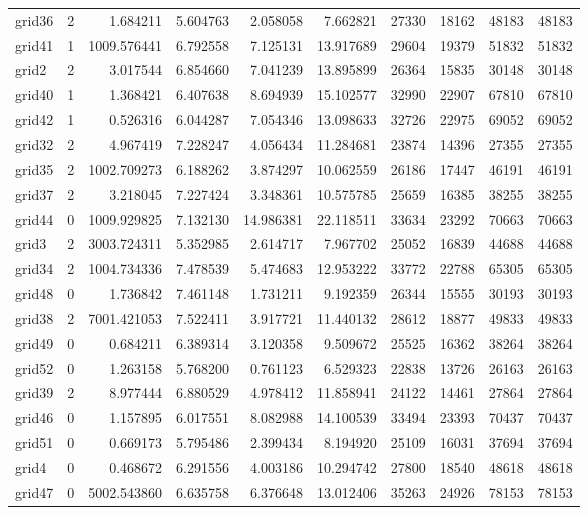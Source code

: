 \begin{longtable}{|l|r|r|r|r|r|r|r|r|r|}
grid36 & 2 & 1.684211 & 5.604763 & 2.058058 & 7.662821 & 27330 & 18162 & 48183 & 48183 \\
grid41 & 1 & 1009.576441 & 6.792558 & 7.125131 & 13.917689 & 29604 & 19379 & 51832 & 51832 \\
grid2 & 2 & 3.017544 & 6.854660 & 7.041239 & 13.895899 & 26364 & 15835 & 30148 & 30148 \\
grid40 & 1 & 1.368421 & 6.407638 & 8.694939 & 15.102577 & 32990 & 22907 & 67810 & 67810 \\
grid42 & 1 & 0.526316 & 6.044287 & 7.054346 & 13.098633 & 32726 & 22975 & 69052 & 69052 \\
grid32 & 2 & 4.967419 & 7.228247 & 4.056434 & 11.284681 & 23874 & 14396 & 27355 & 27355 \\
grid35 & 2 & 1002.709273 & 6.188262 & 3.874297 & 10.062559 & 26186 & 17447 & 46191 & 46191 \\
grid37 & 2 & 3.218045 & 7.227424 & 3.348361 & 10.575785 & 25659 & 16385 & 38255 & 38255 \\
grid44 & 0 & 1009.929825 & 7.132130 & 14.986381 & 22.118511 & 33634 & 23292 & 70663 & 70663 \\
grid3 & 2 & 3003.724311 & 5.352985 & 2.614717 & 7.967702 & 25052 & 16839 & 44688 & 44688 \\
grid34 & 2 & 1004.734336 & 7.478539 & 5.474683 & 12.953222 & 33772 & 22788 & 65305 & 65305 \\
grid48 & 0 & 1.736842 & 7.461148 & 1.731211 & 9.192359 & 26344 & 15555 & 30193 & 30193 \\
grid38 & 2 & 7001.421053 & 7.522411 & 3.917721 & 11.440132 & 28612 & 18877 & 49833 & 49833 \\
grid49 & 0 & 0.684211 & 6.389314 & 3.120358 & 9.509672 & 25525 & 16362 & 38264 & 38264 \\
grid52 & 0 & 1.263158 & 5.768200 & 0.761123 & 6.529323 & 22838 & 13726 & 26163 & 26163 \\
grid39 & 2 & 8.977444 & 6.880529 & 4.978412 & 11.858941 & 24122 & 14461 & 27864 & 27864 \\
grid46 & 0 & 1.157895 & 6.017551 & 8.082988 & 14.100539 & 33494 & 23393 & 70437 & 70437 \\
grid51 & 0 & 0.669173 & 5.795486 & 2.399434 & 8.194920 & 25109 & 16031 & 37694 & 37694 \\
grid4 & 0 & 0.468672 & 6.291556 & 4.003186 & 10.294742 & 27800 & 18540 & 48618 & 48618 \\
grid47 & 0 & 5002.543860 & 6.635758 & 6.376648 & 13.012406 & 35263 & 24926 & 78153 & 78153 \\

\end{longtable}
